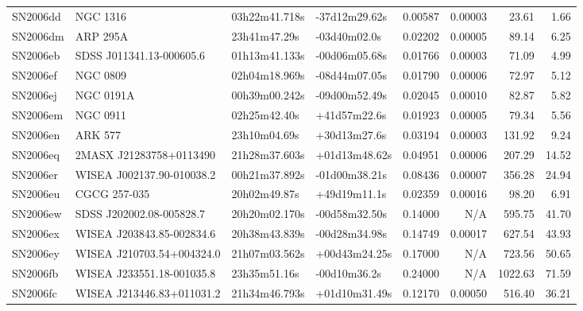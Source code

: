 \begin{longtable}{llllrrrr}
SN2006dd         &                        NGC 1316 &   03h22m41.718s &   -37d12m29.62s &  0.00587 &  0.00003 &    23.61 &        1.66 \\
SN2006dm         &                        ARP 295A &    23h41m47.29s &    -03d40m02.0s &  0.02202 &  0.00005 &    89.14 &        6.25 \\
SN2006eb         &        SDSS J011341.13-000605.6 &   01h13m41.133s &   -00d06m05.68s &  0.01766 &  0.00003 &    71.09 &        4.99 \\
SN2006ef         &                        NGC 0809 &   02h04m18.969s &   -08d44m07.05s &  0.01790 &  0.00006 &    72.97 &        5.12 \\
SN2006ej         &                       NGC 0191A &   00h39m00.242s &   -09d00m52.49s &  0.02045 &  0.00010 &    82.87 &        5.82 \\
SN2006em         &                        NGC 0911 &    02h25m42.40s &    +41d57m22.6s &  0.01923 &  0.00005 &    79.34 &        5.56 \\
SN2006en         &                         ARK 577 &    23h10m04.69s &    +30d13m27.6s &  0.03194 &  0.00003 &   131.92 &        9.24 \\
SN2006eq         &         2MASX J21283758+0113490 &   21h28m37.603s &   +01d13m48.62s &  0.04951 &  0.00006 &   207.29 &       14.52 \\
SN2006er         &       WISEA J002137.90-010038.2 &   00h21m37.892s &   -01d00m38.21s &  0.08436 &  0.00007 &   356.28 &       24.94 \\
SN2006eu         &                    CGCG 257-035 &    20h02m49.87s &    +49d19m11.1s &  0.02359 &  0.00016 &    98.20 &        6.91 \\
SN2006ew         &        SDSS J202002.08-005828.7 &   20h20m02.170s &   -00d58m32.50s &  0.14000 &      N/A &   595.75 &       41.70 \\
SN2006ex         &       WISEA J203843.85-002834.6 &   20h38m43.839s &   -00d28m34.98s &  0.14749 &  0.00017 &   627.54 &       43.93 \\
SN2006ey         &       WISEA J210703.54+004324.0 &   21h07m03.562s &   +00d43m24.25s &  0.17000 &      N/A &   723.56 &       50.65 \\
SN2006fb         &       WISEA J233551.18-001035.8 &    23h35m51.16s &    -00d10m36.2s &  0.24000 &      N/A &  1022.63 &       71.59 \\
SN2006fc         &       WISEA J213446.83+011031.2 &   21h34m46.793s &   +01d10m31.49s &  0.12170 &  0.00050 &   516.40 &       36.21 \\

\end{longtable}

